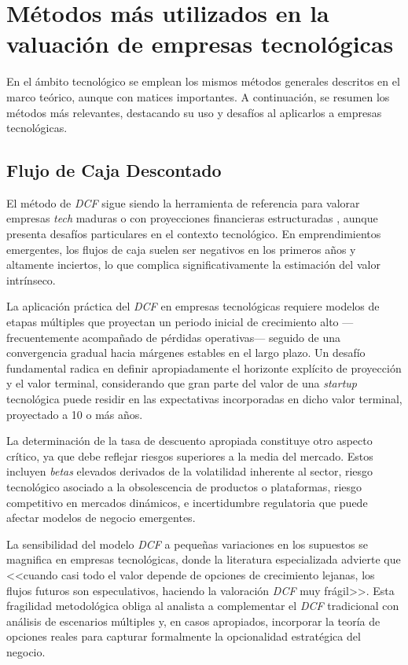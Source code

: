 \section{Métodos más utilizados en la valuación de empresas tecnológicas}

En el ámbito tecnológico se emplean los mismos métodos generales descritos en el marco teórico, aunque con matices importantes. A continuación, se resumen los métodos más relevantes, destacando su uso y desafíos al aplicarlos a empresas tecnológicas.

\subsection{Flujo de Caja Descontado}

El método de \emph{DCF} sigue siendo la herramienta de referencia para valorar empresas \emph{tech} maduras o con proyecciones financieras estructuradas \citep{kruze2023}, aunque presenta desafíos particulares en el contexto tecnológico. En emprendimientos emergentes, los flujos de caja suelen ser negativos en los primeros años y altamente inciertos, lo que complica significativamente la estimación del valor intrínseco.

La aplicación práctica del \emph{DCF} en empresas tecnológicas requiere modelos de etapas múltiples que proyectan un periodo inicial de crecimiento alto ---frecuentemente acompañado de pérdidas operativas--- seguido de una convergencia gradual hacia márgenes estables en el largo plazo. Un desafío fundamental radica en definir apropiadamente el horizonte explícito de proyección y el valor terminal, considerando que gran parte del valor de una \emph{startup} tecnológica puede residir en las expectativas incorporadas en dicho valor terminal, proyectado a 10 o más años.

La determinación de la tasa de descuento apropiada constituye otro aspecto crítico, ya que debe reflejar riesgos superiores a la media del mercado. Estos incluyen \emph{betas} elevados derivados de la volatilidad inherente al sector, riesgo tecnológico asociado a la obsolescencia de productos o plataformas, riesgo competitivo en mercados dinámicos, e incertidumbre regulatoria que puede afectar modelos de negocio emergentes.

La sensibilidad del modelo \emph{DCF} a pequeñas variaciones en los supuestos se magnifica en empresas tecnológicas, donde la literatura especializada advierte que <<cuando casi todo el valor depende de opciones de crecimiento lejanas, los flujos futuros son especulativos, haciendo la valoración \emph{DCF} muy frágil>>. Esta fragilidad metodológica obliga al analista a complementar el \emph{DCF} tradicional con análisis de escenarios múltiples y, en casos apropiados, incorporar la teoría de opciones reales para capturar formalmente la opcionalidad estratégica del negocio.

